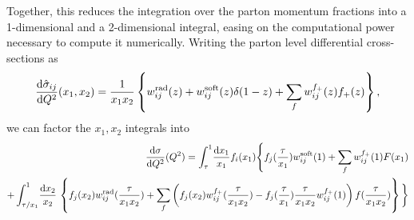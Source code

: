 \documentclass[../main.tex]{subfiles}
\begin{document}
Together, this reduces the integration over the parton momentum fractions into a 1-dimensional and a 2-dimensional integral, easing on the computational power necessary to compute it numerically.
Writing the parton level differential cross-sections as
\begin{equation}
  \d[Q^2]{\hat\sigma_{ij}}(x_1, x_2) = \frac{1}{x_1 x_2} \cclosed{w_{ij}^\text{rad}(z) + w_{ij}^\text{soft}(z) \delta(1-z) + \sum_{f} w_{ij}^{f_+}(z) f_+(z)},
\end{equation}
we can factor the \(x_1, x_2\) integrals into
\begin{align}
  \nonumber
  \d[Q^2]{\sigma}(Q^2) = \int_{\tau}^1 \! \frac{\mathrm{d}x_1}{x_1} f_i(x_1) \Bigg\{ f_j(\frac{\tau}{x_1})w^\text{soft}_{ij}(1) + \sum_f w^{f_+}_{ij}(1) F(x_1) \\
  + \int_{\tau/x_1}^1\!\frac{\mathrm{d}x_2}{x_2}\, \cclosed{f_j(x_2) w^\text{rad}_{ij}(\frac{\tau}{x_1 x_2}) +  \sum_f \pclosed{f_j(x_2) w^{f_+}_{ij}(\frac{\tau}{x_1 x_2}) - f_j(\frac{\tau}{x_1}) \frac{\tau}{x_1 x_2} w^{f_+}_{ij}(1)} f(\frac{\tau}{x_1 x_2})} \bigg\}
\end{align}
\end{document}

